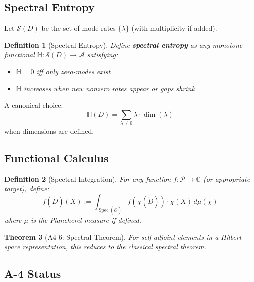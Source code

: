 \documentclass[12pt, oneside]{article}
\newtheorem{theorem}{Theorem}[section]
\newtheorem{definition}[theorem]{Definition}
\DeclareMathOperator{\Spec}{Spec}
\newcommand{\A}{\mathcal{A}}
\newcommand{\Opr}{\mathcal{O}}
\newcommand{\wtilde}{\widetilde}
\begin{document}
\subsection{Spectral Entropy}

Let $\mathcal{S}(D)$ be the set of mode rates $\{\lambda\}$ (with multiplicity if added).

\begin{definition}[Spectral Entropy]
Define \textbf{spectral entropy} as any monotone functional $\mathbb{H}: \mathcal{S}(D) \rightarrow \A$ satisfying:
\begin{itemize}
    \item $\mathbb{H} = 0$ iff only zero-modes exist
    \item $\mathbb{H}$ increases when new nonzero rates appear or gaps shrink
\end{itemize}
\end{definition}

A canonical choice:
\begin{equation}
\mathbb{H}(D) = \sum_{\lambda \neq 0} \lambda \cdot \dim(\lambda)
\end{equation}
when dimensions are defined.

\subsection{Functional Calculus}

\begin{definition}[Spectral Integration]
For any function $f: \mathcal{P} \rightarrow \mathbb{C}$ (or appropriate target), define:
\begin{equation}
f(\wtilde{D})(X) := \int_{\Spec(\wtilde{\Opr})} f(\chi(\wtilde{D})) \cdot \chi(X) \, d\mu(\chi)
\end{equation}
where $\mu$ is the Plancherel measure if defined.
\end{definition}

\begin{theorem}[A4-6: Spectral Theorem]
For self-adjoint elements in a Hilbert space representation, this reduces to the classical spectral theorem.
\end{theorem}

\subsection{A-4 Status}
\end{document}
